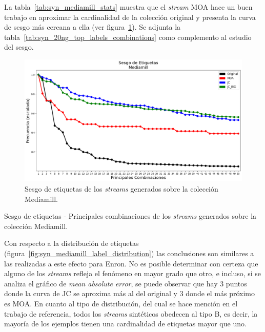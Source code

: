 La tabla~\ref{tab:syn_mediamill_stats} muestra que el \textit{stream} MOA hace
un buen trabajo en aproximar la cardinalidad de la colección original y presenta
la curva de sesgo más cercana a ella (ver
figura~\ref{fig:syn_mediamill_label_skew}). Se adjunta la
tabla~\ref{tab:syn_20ng_top_labels_combinations} como complemento al estudio del
sesgo.

\begin{figure}[htbp]
	\includegraphics[width=\linewidth]{figures/experiments/syn/mediamill/label_skew.png}
	\caption{Sesgo de etiquetas de los \textit{streams} generados sobre la
		colección Mediamill.}
	\label{fig:syn_mediamill_label_skew}
\end{figure}

\begin{table}[htbp]
	\centering
	\begin{adjustbox}{max width=\textwidth}
		
	\end{adjustbox}
	\caption{Sesgo de etiquetas - Principales combinaciones de los
		\textit{streams} generados sobre la colección Mediamill.}
	\label{tab:syn_mediamill_top_labels_combinations}
\end{table}

Con respecto a la distribución de etiquetas
(figura~\ref{fig:syn_mediamill_label_distribution}) las conclusiones son
similares a las realizadas a este efecto para Enron. No es posible determinar
con certeza que alguno de los \textit{streams} refleja el fenómeno en mayor
grado que otro, e incluso, si se analiza el gráfico de \textit{mean absolute
	error}, se puede observar que hay 3 puntos donde la curva de JC se aproxima más
al del original y 3 donde el más próximo es MOA. En cuanto al tipo de
distribución, del cual se hace mención en el trabajo de referencia, todos los
\textit{streams} sintéticos obedecen al tipo B, es decir, la mayoría de los
ejemplos tienen una cardinalidad de etiquetas mayor que uno.

